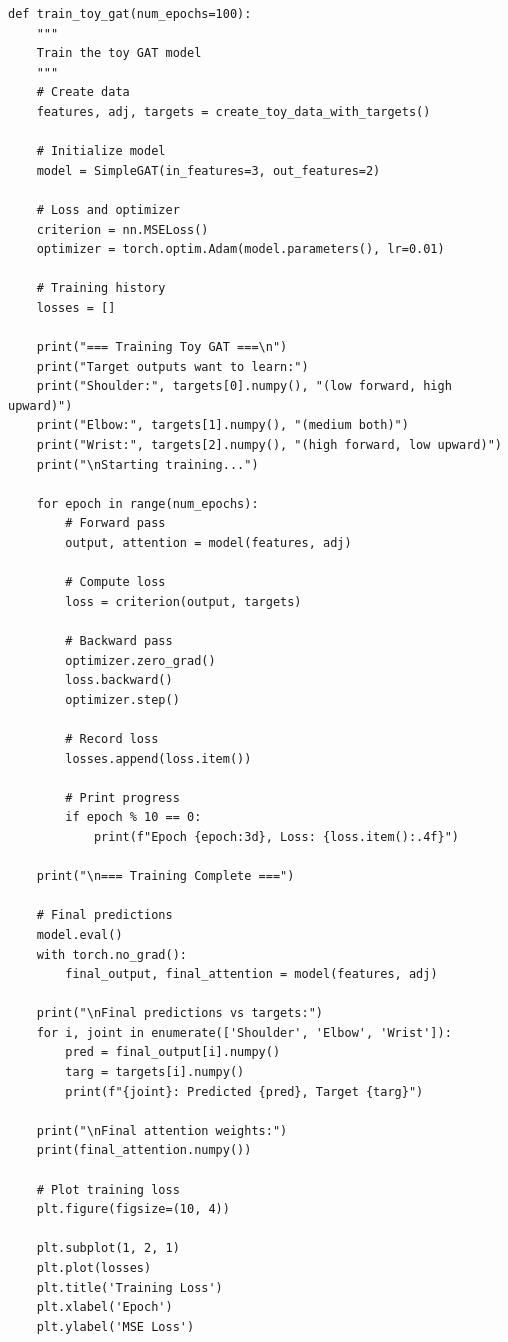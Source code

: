 \begin{lstlisting}[style=pythonstyle,title={Train toy gat function},label={code:train_toy_gat}]
def train_toy_gat(num_epochs=100):
    """
    Train the toy GAT model
    """
    # Create data
    features, adj, targets = create_toy_data_with_targets()
    
    # Initialize model
    model = SimpleGAT(in_features=3, out_features=2)
    
    # Loss and optimizer
    criterion = nn.MSELoss()
    optimizer = torch.optim.Adam(model.parameters(), lr=0.01)
    
    # Training history
    losses = []
    
    print("=== Training Toy GAT ===\n")
    print("Target outputs want to learn:")
    print("Shoulder:", targets[0].numpy(), "(low forward, high upward)")
    print("Elbow:", targets[1].numpy(), "(medium both)")
    print("Wrist:", targets[2].numpy(), "(high forward, low upward)")
    print("\nStarting training...")
    
    for epoch in range(num_epochs):
        # Forward pass
        output, attention = model(features, adj)
        
        # Compute loss
        loss = criterion(output, targets)
        
        # Backward pass
        optimizer.zero_grad()
        loss.backward()
        optimizer.step()
        
        # Record loss
        losses.append(loss.item())
        
        # Print progress
        if epoch % 10 == 0:
            print(f"Epoch {epoch:3d}, Loss: {loss.item():.4f}")
    
    print("\n=== Training Complete ===")
    
    # Final predictions
    model.eval()
    with torch.no_grad():
        final_output, final_attention = model(features, adj)
    
    print("\nFinal predictions vs targets:")
    for i, joint in enumerate(['Shoulder', 'Elbow', 'Wrist']):
        pred = final_output[i].numpy()
        targ = targets[i].numpy()
        print(f"{joint}: Predicted {pred}, Target {targ}")
    
    print("\nFinal attention weights:")
    print(final_attention.numpy())
    
    # Plot training loss
    plt.figure(figsize=(10, 4))
    
    plt.subplot(1, 2, 1)
    plt.plot(losses)
    plt.title('Training Loss')
    plt.xlabel('Epoch')
    plt.ylabel('MSE Loss')
    

\end{lstlisting}

